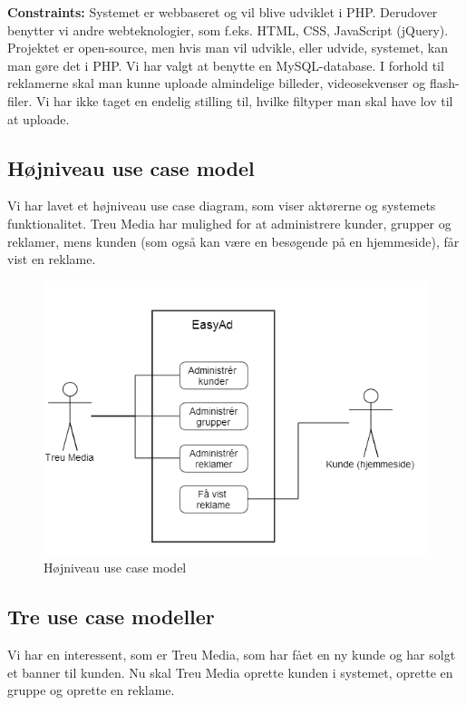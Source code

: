 \documentclass[a4paper,12pt]{article}
\begin{document}
\textbf{Constraints:} Systemet er webbaseret og vil blive udviklet i PHP. Derudover benytter vi andre webteknologier, som f.eks. HTML, CSS, JavaScript (jQuery). Projektet er open-source, men hvis man vil udvikle, eller udvide, systemet, kan man gøre det i PHP. Vi har valgt at benytte en MySQL-database. I forhold til reklamerne skal man kunne uploade almindelige billeder, videosekvenser og flash-filer. Vi har ikke taget en endelig stilling til, hvilke filtyper man skal have lov til at uploade.

\subsection{Højniveau use case model}
Vi har lavet et højniveau use case diagram, som viser aktørerne og systemets funktionalitet. Treu Media har mulighed for at administrere kunder, grupper og reklamer, mens kunden (som også kan være en besøgende på en hjemmeside), får vist en reklame.

\begin{figure}[h!]
  \centering
    \includegraphics[scale=0.5]{use_case.png}
  \caption{Højniveau use case model}
\end{figure}

\subsection{Tre use case modeller}
Vi har en interessent, som er Treu Media, som har fået en ny kunde og har solgt et banner til kunden. Nu skal Treu Media oprette kunden i systemet, oprette en gruppe og oprette en reklame.
\end{document}
